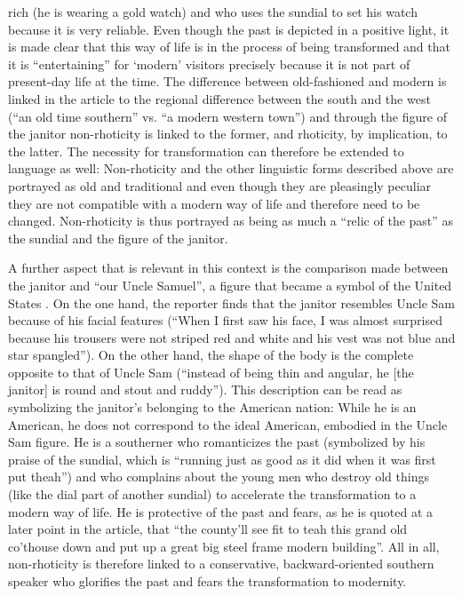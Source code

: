 rich (he is wearing a gold watch) and who uses the sundial to set his watch because it is very reliable. Even though the past is depicted in a positive light, it is made clear that this way of life is in the process of being transformed and that it is “entertaining” for ‘modern’ visitors precisely because it is not part of present-day life at the time. The difference between old-fashioned and modern is linked in the article to the regional difference between the south and the west (“an old time southern” vs. “a modern western town”) and through the figure of the janitor non-rhoticity is linked to the former, and rhoticity, by implication, to the latter. The necessity for transformation can therefore be extended to language as well: Non-rhoticity and the other linguistic forms described above are portrayed as old and traditional and even though they are pleasingly peculiar they are not compatible with a modern way of life and therefore need to be changed. Non-rhoticity is thus portrayed as being as much a “relic of the past” as the sundial and the figure of the janitor.

A further aspect that is relevant in this context is the comparison made between the janitor and “our Uncle Samuel”, a figure that became a symbol of the United States \citep[321]{Vile2018}. On the one hand, the reporter finds that the janitor resembles Uncle Sam because of his facial features (“When I first saw his face, I was almost surprised because his trousers were not striped red and white and his vest was not blue and star spangled”). On the other hand, the shape of the body is the complete opposite to that of Uncle Sam (“instead of being thin and angular, he [the janitor] is round and stout and ruddy”). This description can be read as symbolizing the janitor’s belonging to the American nation: While he is an American, he does not correspond to the ideal American, embodied in the Uncle Sam figure. He is a southerner who romanticizes the past (symbolized by his praise of the sundial, which is “running just as good as it did when it was first put theah”) and who complains about the young men who destroy old things (like the dial part of another sundial) to accelerate the transformation to a modern way of life. He is protective of the past and fears, as he is quoted at a later point in the article, that “the county’ll see fit to teah this grand old co’thouse down and put up a great big steel frame modern building”. All in all, non-rhoticity is therefore linked to a conservative, backward-oriented southern speaker who glorifies the past and fears the transformation to modernity.

